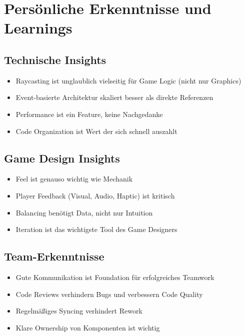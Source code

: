\documentclass[
  a4paper,
  11pt,
  ngerman,
  parskip=half,
  bibliography=totoc,
  listof=totoc
]{scrreprt}
\begin{document}
\section{Persönliche Erkenntnisse und Learnings}

\subsection{Technische Insights}

\begin{itemize}
    \item Raycasting ist unglaublich vielseitig für Game Logic (nicht nur Graphics)
    \item Event-basierte Architektur skaliert besser als direkte Referenzen
    \item Performance ist ein Feature, keine Nachgedanke
    \item Code Organization ist Wert der sich schnell auszahlt
\end{itemize}

\subsection{Game Design Insights}

\begin{itemize}
    \item Feel ist genauso wichtig wie Mechanik
    \item Player Feedback (Visual, Audio, Haptic) ist kritisch
    \item Balancing benötigt Data, nicht nur Intuition
    \item Iteration ist das wichtigste Tool des Game Designers
\end{itemize}

\subsection{Team-Erkenntnisse}

\begin{itemize}
    \item Gute Kommunikation ist Foundation für erfolgreiches Teamwork
    \item Code Reviews verhindern Bugs und verbessern Code Quality
    \item Regelmäßiges Syncing verhindert Rework
    \item Klare Ownership von Komponenten ist wichtig
\end{itemize}
\end{document}
